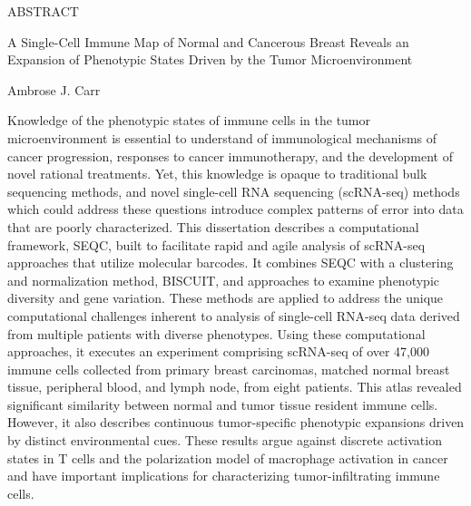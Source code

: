 
\pagestyle{empty} %
\begin{center}
  ABSTRACT

  A Single-Cell Immune Map of Normal and Cancerous Breast Reveals an Expansion of Phenotypic States Driven by the Tumor Microenvironment

  Ambrose J. Carr
\end{center}

Knowledge of the phenotypic states of immune cells in the tumor microenvironment is essential to understand of immunological mechanisms of cancer progression, responses to cancer immunotherapy, and the development of novel rational treatments.
Yet, this knowledge is opaque to traditional bulk sequencing methods, and novel single-cell RNA sequencing (scRNA-seq) methods which could address these questions introduce complex patterns of error into data that are poorly characterized. 
This dissertation describes a computational framework, SEQC, built to facilitate rapid and agile analysis of scRNA-seq approaches that utilize molecular barcodes.
It combines SEQC with a clustering and normalization method, BISCUIT, and approaches to examine phenotypic diversity and gene variation. 
These methods are applied to address the unique computational challenges inherent to analysis of single-cell RNA-seq data derived from multiple patients with diverse phenotypes. 
Using these computational approaches, it executes an experiment comprising scRNA-seq of over 47,000 immune cells collected from primary breast carcinomas, matched normal breast tissue, peripheral blood, and lymph node, from eight patients.  
This atlas revealed significant similarity between normal and tumor tissue resident immune cells.
However, it also describes continuous tumor-specific phenotypic expansions driven by distinct environmental cues.
These results argue against discrete activation states in T cells and the polarization model of macrophage activation in cancer and have important implications for characterizing tumor-infiltrating immune cells.
